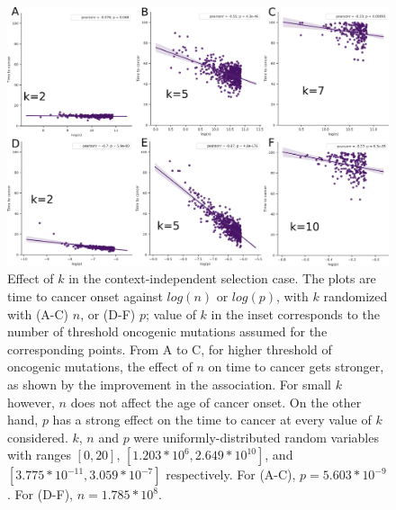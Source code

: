 \documentclass[9pt,onecolumn,twoside]{pnas-new}
\begin{document}
		\begin{figure}[tbhp]
			\centering
			\includegraphics[width=.8\linewidth]{figS2-3.png}
			\caption{Effect of $k$ in the context-independent selection case. The plots are time to cancer onset against $log(n)$ or $log(p)$, with $k$ randomized with (A-C) $n$, or (D-F) $p$; value of $k$ in the inset corresponds to the number of threshold oncogenic mutations assumed for the corresponding points. From A to C, for higher threshold of oncogenic mutations, the effect of $n$ on time to cancer gets stronger, as shown by the improvement in the association. For small $k$ however, $n$ does not affect the age of cancer onset. On the other hand, $p$ has a strong effect on the time to cancer at every value of $k$ considered. $k$, $n$ and $p$ were uniformly-distributed random variables with ranges $[0, 20]$, $[1.203*10^{6}, 2.649*10^{10}]$, and $[3.775*10^{-11}, 3.059*10^{-7}]$ respectively. For (A-C), $p=5.603*10^{-9}$. For (D-F), $n=1.785*10^{8}$.}
			\label{figS2.3}
		\end{figure}
\end{document}
